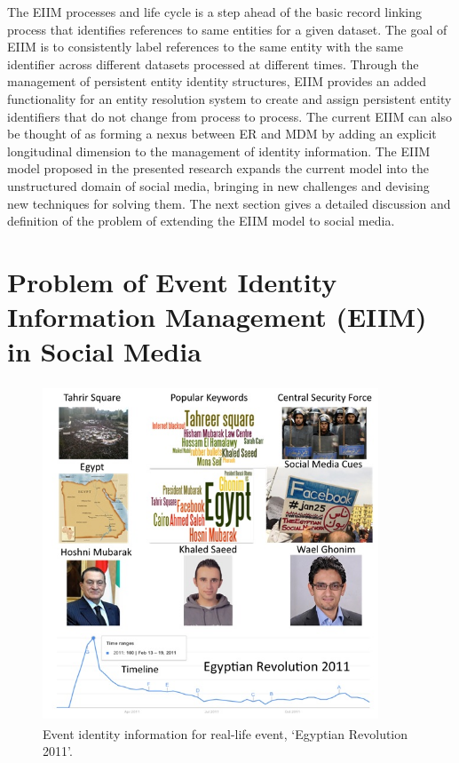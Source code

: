 The EIIM processes and life cycle is a step ahead of the basic record linking process that identifies references to same entities for a given dataset. The goal of EIIM is to consistently label references to the same entity with the same identifier across different datasets processed at different times. Through the management of persistent entity identity structures, EIIM provides an added functionality for an entity resolution system to create and assign persistent entity identifiers that do not change from process to process. The current EIIM can also be thought of as forming a nexus between ER and MDM by adding an explicit longitudinal dimension to the management of identity information. The EIIM model proposed in the presented research expands the current model into the unstructured domain of social media, bringing in new challenges and devising new techniques for solving them. The next section gives a detailed discussion and definition of the problem of extending the EIIM model to social media.

\section{Problem of Event Identity Information Management (EIIM) in Social Media\label{problem}}

\begin{figure}[htbp]
  \caption{Event identity information for real-life event, `Egyptian Revolution 2011'.}
\label{eventidentity}
  \centering
    \includegraphics[width=10cm,height=10cm]{Figures/eventIdentity.jpg}
\end{figure}


